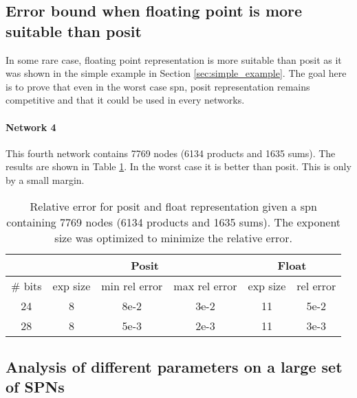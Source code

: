 \subsection{Error bound when floating point is more suitable than posit}

In some rare case, floating point representation is more suitable than posit as it was shown in the simple example in Section \ref{sec:simple_example}. The goal here is to prove that even in the worst case \gls{spn}, posit representation remains competitive and that it could be used in every networks.

\paragraph{Network 4}

This fourth network contains 7769 nodes (6134 products and 1635 sums). The results are shown in Table \ref{tab:net4_res}. In the worst case it  is better than posit. This is only by a small margin.

\begin{table}[!ht]
	\centering
	\caption{Relative error for posit and float representation given a \gls{spn} containing 7769 nodes (6134 products and 1635 sums). The exponent size was optimized to minimize the relative error.}
	\label{tab:net4_res}
	\begin{tabular}{|c||c|c|c||c|c|}
	\hline
		& \multicolumn{3}{c||}{Posit} &  \multicolumn{2}{c|}{Float} \\
	\hline
		\# bits & exp size & min rel error & max rel error & exp size & rel error \\
	\hline
		24 & 8 & 8e-2 & 3e-2 & 11 & 5e-2 \\
		28 & 8 & 5e-3 & 2e-3 & 11 & 3e-3 \\
	\hline
	\end{tabular}
\end{table}



\subsection{Analysis of different parameters on a large set of SPNs}

